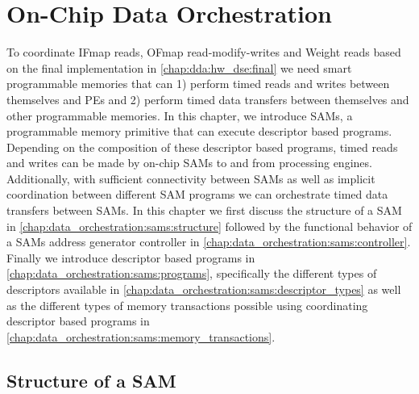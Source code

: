 \chapter{On-Chip Data Orchestration}
\label{chap:data_orchestration}

To coordinate IFmap reads, OFmap read-modify-writes and Weight reads based on
the final implementation in \autoref{chap:dda:hw_dse:final} we need smart
programmable memories that can 1) perform timed reads and writes between
themselves and PEs and 2) perform timed data transfers between
themselves and other programmable memories. In this chapter, we introduce \ac{SAM}s, a programmable memory
primitive that can execute descriptor based programs. Depending on the
composition of these descriptor based programs, timed reads and writes can be
made by on-chip SAMs to and from processing engines. Additionally, with sufficient
connectivity between SAMs as well as implicit coordination between different SAM
programs we can orchestrate timed data transfers between SAMs. In this chapter
we first discuss the structure of a SAM in \autoref{chap:data_orchestration:sams:structure}
followed by the functional behavior of a SAMs address generator controller in
\autoref{chap:data_orchestration:sams:controller}. Finally we introduce descriptor based programs in
\autoref{chap:data_orchestration:sams:programs}, specifically the different types of descriptors
available in \autoref{chap:data_orchestration:sams:descriptor_types} as well as the different types
of memory transactions possible using coordinating descriptor based programs in
\autoref{chap:data_orchestration:sams:memory_transactions}.

\clearpage
\section{Structure of a SAM}
\label{chap:data_orchestration:sams:structure}

